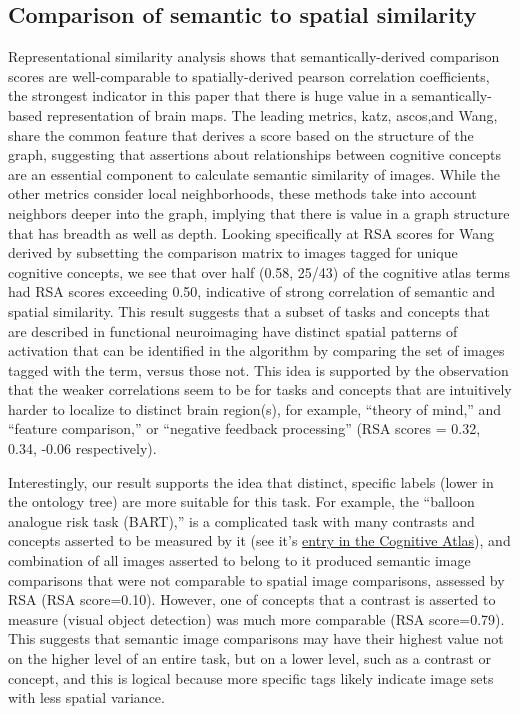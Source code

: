 \documentclass{report}
\begin{document}
\subsection{Comparison of semantic to spatial similarity}

Representational similarity analysis shows that semantically-derived
comparison scores are well-comparable to spatially-derived pearson
correlation coefficients, the strongest indicator in this paper that
there is huge value in a semantically-based representation of brain
maps. The leading metrics, katz, ascos,and Wang, share the common feature that derives a score based on the structure of the graph, suggesting that assertions about relationships between cognitive concepts are an essential component to calculate semantic similarity of images. While the other metrics consider local neighborhoods, these methods take into account neighbors deeper into the graph, implying that there is value in a graph structure that has breadth as well as depth. Looking specifically at RSA scores for Wang derived by subsetting the comparison matrix to images tagged for unique cognitive concepts, we see that over half (0.58, 25/43) of the cognitive atlas terms had RSA scores exceeding 0.50, indicative of strong correlation of semantic and
spatial similarity. This result suggests that a subset of tasks and
concepts that are described in functional neuroimaging have distinct
spatial patterns of activation that can be identified in the algorithm
by comparing the set of images tagged with the term, versus those not.
This idea is supported by the observation that the weaker correlations
seem to be for tasks and concepts that are intuitively harder to
localize to distinct brain region(s), for example, ``theory of mind,''
and ``feature comparison,'' or ``negative feedback processing'' (RSA
scores = 0.32, 0.34, -0.06 respectively).

Interestingly, our result supports the idea that distinct, specific
labels (lower in the ontology tree) are more suitable for this task. For
example, the ``balloon analogue risk task (BART),'' is a complicated
task with many contrasts and concepts asserted to be measured by it (see
it's
\href{http://www.cognitiveatlas.org/term/id/trm_4d559bcd67c18}{entry in the Cognitive Atlas}), and combination of all images asserted to
belong to it produced semantic image comparisons that were not
comparable to spatial image comparisons, assessed by RSA (RSA
score=0.10). However, one of concepts that a contrast is asserted to
measure (visual object detection) was much more comparable (RSA
score=0.79). This suggests that semantic image comparisons may have
their highest value not on the higher level of an entire task, but on a
lower level, such as a contrast or concept, and this is logical because
more specific tags likely indicate image sets with less spatial
variance.
\end{document}
